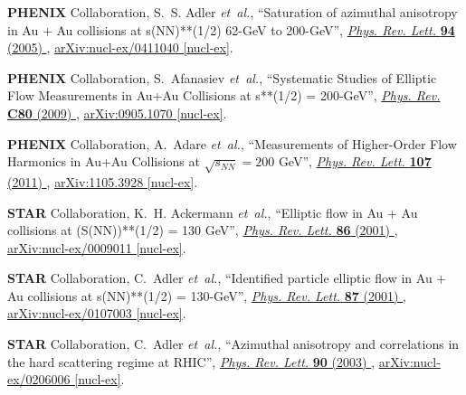 \documentclass[ALICE,manyauthors]{cernphprep}
\begin{document}
\begin{thebibliography}{10}
{\bfseries PHENIX} Collaboration, S.~S. Adler {\em et~al.}, ``{Saturation of
  azimuthal anisotropy in Au + Au collisions at s(NN)**(1/2) 62-GeV to
  200-GeV}'', \href{http://dx.doi.org/10.1103/PhysRevLett.94.232302}{{\em Phys.
  Rev. Lett.} {\bfseries 94} (2005) },
\href{http://arxiv.org/abs/nucl-ex/0411040}{{\ttfamily arXiv:nucl-ex/0411040
  [nucl-ex]}}.

{\bfseries PHENIX} Collaboration, S.~Afanasiev {\em et~al.}, ``{Systematic
  Studies of Elliptic Flow Measurements in Au+Au Collisions at s**(1/2) =
  200-GeV}'', \href{http://dx.doi.org/10.1103/PhysRevC.80.024909}{{\em Phys.
  Rev.} {\bfseries C80} (2009) },
\href{http://arxiv.org/abs/0905.1070}{{\ttfamily arXiv:0905.1070 [nucl-ex]}}.

{\bfseries PHENIX} Collaboration, A.~Adare {\em et~al.}, ``{Measurements of
  Higher-Order Flow Harmonics in Au+Au Collisions at $\sqrt{s_{NN}} = 200$
  GeV}'', \href{http://dx.doi.org/10.1103/PhysRevLett.107.252301}{{\em Phys.
  Rev. Lett.} {\bfseries 107} (2011) },
\href{http://arxiv.org/abs/1105.3928}{{\ttfamily arXiv:1105.3928 [nucl-ex]}}.

{\bfseries STAR} Collaboration, K.~H. Ackermann {\em et~al.}, ``{Elliptic flow
  in Au + Au collisions at (S(NN))**(1/2) = 130 GeV}'',
  \href{http://dx.doi.org/10.1103/PhysRevLett.86.402}{{\em Phys. Rev. Lett.}
  {\bfseries 86} (2001) },
\href{http://arxiv.org/abs/nucl-ex/0009011}{{\ttfamily arXiv:nucl-ex/0009011
  [nucl-ex]}}.

{\bfseries STAR} Collaboration, C.~Adler {\em et~al.}, ``{Identified particle
  elliptic flow in Au + Au collisions at s(NN)**(1/2) = 130-GeV}'',
  \href{http://dx.doi.org/10.1103/PhysRevLett.87.182301}{{\em Phys. Rev. Lett.}
  {\bfseries 87} (2001) },
\href{http://arxiv.org/abs/nucl-ex/0107003}{{\ttfamily arXiv:nucl-ex/0107003
  [nucl-ex]}}.

{\bfseries STAR} Collaboration, C.~Adler {\em et~al.}, ``{Azimuthal anisotropy
  and correlations in the hard scattering regime at RHIC}'',
  \href{http://dx.doi.org/10.1103/PhysRevLett.90.032301}{{\em Phys. Rev. Lett.}
  {\bfseries 90} (2003) },
\href{http://arxiv.org/abs/nucl-ex/0206006}{{\ttfamily arXiv:nucl-ex/0206006
  [nucl-ex]}}.


\end{thebibliography}
\end{document}
